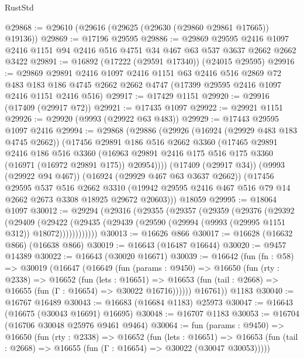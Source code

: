 \begin{lexlean}{RustStd}
\begin{coremodule}
@29868 := @29610 (@29616 (@29625 (@29630 (@29860 @29861 @17665)) @19136))
@29869 := @17196 @29595
@29886 := @29869
    @29595
    @2416
    @1097
    @2416
    @1151
    @94
    @2416
    @516
    @4751
    @34
    @467
    @63
    @537
    @3637
    @2662
    @2662
    @3422
@29891 := @16892 (@17222 (@29591 @17340)) (@24015 @29595)
@29916 := @29869
    @29891
    @2416
    @1097
    @2416
    @1151
    @63
    @2416
    @516
    @2869
    @72
    @483
    @183
    @186
    @4745
    @2662
    @2662
    @4747
    (@17399 @29595 @2416 @1097 @2416 @1151 @2416 @516)
@29917 := @17429 @1151
@29920 := @29916 (@17409 (@29917 @72))
@29921 := @17435 @1097
@29922 := @29921 @1151
@29926 := @29920 (@9993 (@29922 @63 @483))
@29929 := @17443 @29595 @1097 @2416
@29994 := @29868
    (@29886
      (@29926
        (@16924 (@29929 @483 @183 @4745 @2662))
        (@17456
          @29891
          @186
          @516
          @2662
          @3360
          (@17465
            @29891
            @2416
            @186
            @516
            @3360
            (@16963 @29891 @2416 @175 @516 @175 @3360 (@16971 (@16972 @29891 @175)) @20954))))
      (@17409 (@29917 @34))
      (@9993 (@29922 @94 @467))
      (@16924 (@29929 @467 @63 @3637 @2662))
      (@17456
        @29595
        @537
        @516
        @2662
        @3310
        (@19942 @29595 @2416 @467 @516 @79 @14 @2662 @2673 @3308 @18925 @29672 @20603)))
    @18059
@29995 := @18064 @1097
@30012 := @29294
    (@29316
      (@29355
        (@29357
          (@29359
            (@29376
              (@29392
                (@29409
                  (@29422
                    (@29435 (@29439 (@29590 (@29994 (@9993 (@29995 @1151 @312)) @18072))))))))))))
@30013 := @16626 @866
@30017 := @16628 (@16632 @866) (@16638 @866)
@30019 := @16643 (@16487 @16644)
@30020 := @9457 @14389
@30022 := @16643 (@30020 @16671)
@30039 := @16642
    (fun (fn : @58) =>
    @30019
      (@16647
        (@16649
          (fun (params : @9450) =>
          @16650
            (fun (rty : @2338) =>
            @16652
              (fun (lets : @16651) =>
              @16653 (fun (tail : @2668) => @16655 (fun (Γ : @16654) => @30022 @16716))))))
        @16761))
    @1183
@30040 := @16767 @16489
@30043 := @16683 (@16684 @1183) @25973
@30047 := @16643 (@16675 (@30043 @16691) @16695)
@30048 := @16707 @1183
@30053 := @16704 (@16706 @30048 @25976 @9461 @9464)
@30064 := fun (params : @9450) =>
  @16650
    (fun (rty : @2338) =>
    @16652
      (fun (lets : @16651) =>
      @16653 (fun (tail : @2668) => @16655 (fun (Γ : @16654) => @30022 (@30047 @30053)))))

\end{coremodule}
\end{lexlean}
